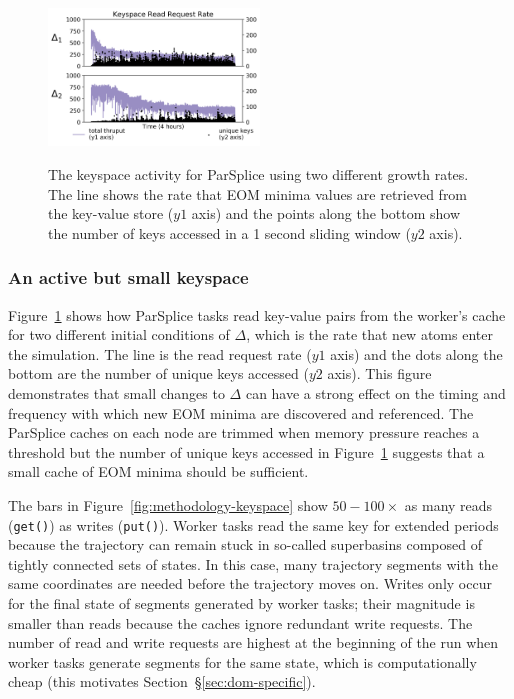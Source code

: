 \begin{figure}[t]
  \noindent\includegraphics[width=0.5\textwidth]{figures/motivation-regimes.png}\\
  \caption{The keyspace activity for ParSplice using two different growth
rates.  The line shows the rate that EOM minima values are retrieved from the
key-value store (\(y1\) axis) and the points along the bottom show the number
of keys accessed in a 1 second sliding window (\(y2\) axis).
\label{fig:motivation-regimes}}
\end{figure}

\subsubsection*{An active but small keyspace}
Figure~\ref{fig:motivation-regimes} shows how ParSplice tasks read key-value
pairs from the worker's cache for two different initial conditions of
\(\Delta\), which is the rate that new atoms enter the simulation.  The line is
the read request rate (\(y1\) axis) and the dots along the bottom are the
number of unique keys accessed (\(y2\) axis).  This figure demonstrates that
small changes to \(\Delta\) can have a strong effect on the timing and
frequency with which new EOM minima are discovered and referenced.  The
ParSplice caches on each node are trimmed when memory pressure reaches a
threshold but the number of unique keys accessed in
Figure~\ref{fig:motivation-regimes} suggests that a small cache of EOM minima
should be sufficient. 




The bars in
Figure~\ref{fig:methodology-keyspace} show \(50-100\times\) as many reads
(\texttt{get()}) as writes (\texttt{put()}).  Worker tasks read the same key
for extended periods because the trajectory can remain stuck in so-called
superbasins composed of tightly connected sets of states. In this case, many
trajectory segments with the same coordinates are needed before the trajectory
moves on.  Writes only occur for the final state of segments generated by
worker tasks; their magnitude is smaller than reads because the caches ignore
redundant write requests. The number of read and write requests are highest at
the beginning of the run when worker tasks generate segments for the same
state, which is computationally cheap (this motivates
Section~\S\ref{sec:dom-specific}).

